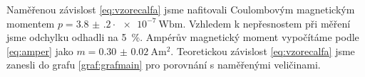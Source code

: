 Naměřenou závislost \eqref{eq:vzorecalfa} jsme nafitovali Coulombovým magnetickým momentem $p = \num{3.8(2)} \cdot \SI{e-7}{\weber \meter}$.
Vzhledem k nepřesnostem při měření jsme odchylku odhadli na \SI{5}{\percent}.
Ampérův magnetický moment vypočítáme podle \eqref{eq:amper} jako $m = \SI{0.30(2)}{\ampere\metre\squared}$.
Teoretickou závislost \eqref{eq:vzorecalfa} jsme zanesli do grafu \ref{graf:grafmain} pro porovnání s naměřenými veličinami.
